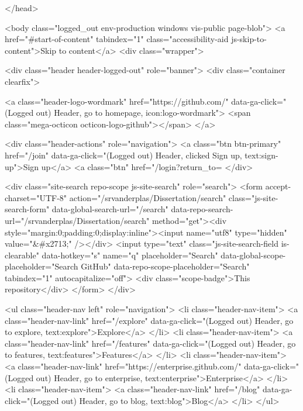   </head>


  <body class="logged_out  env-production windows vis-public page-blob">
    <a href="#start-of-content" tabindex="1" class="accessibility-aid js-skip-to-content">Skip to content</a>
    <div class="wrapper">
      
      
      


        
        <div class="header header-logged-out" role="banner">
  <div class="container clearfix">

    <a class="header-logo-wordmark" href="https://github.com/" data-ga-click="(Logged out) Header, go to homepage, icon:logo-wordmark">
      <span class="mega-octicon octicon-logo-github"></span>
    </a>

    <div class="header-actions" role="navigation">
        <a class="btn btn-primary" href="/join" data-ga-click="(Logged out) Header, clicked Sign up, text:sign-up">Sign up</a>
      <a class="btn" href="/login?return_to=%
    </div>

    <div class="site-search repo-scope js-site-search" role="search">
      <form accept-charset="UTF-8" action="/srvanderplas/Dissertation/search" class="js-site-search-form" data-global-search-url="/search" data-repo-search-url="/srvanderplas/Dissertation/search" method="get"><div style="margin:0;padding:0;display:inline"><input name="utf8" type="hidden" value="&#x2713;" /></div>
  <input type="text"
    class="js-site-search-field is-clearable"
    data-hotkey="s"
    name="q"
    placeholder="Search"
    data-global-scope-placeholder="Search GitHub"
    data-repo-scope-placeholder="Search"
    tabindex="1"
    autocapitalize="off">
  <div class="scope-badge">This repository</div>
</form>
    </div>

      <ul class="header-nav left" role="navigation">
          <li class="header-nav-item">
            <a class="header-nav-link" href="/explore" data-ga-click="(Logged out) Header, go to explore, text:explore">Explore</a>
          </li>
          <li class="header-nav-item">
            <a class="header-nav-link" href="/features" data-ga-click="(Logged out) Header, go to features, text:features">Features</a>
          </li>
          <li class="header-nav-item">
            <a class="header-nav-link" href="https://enterprise.github.com/" data-ga-click="(Logged out) Header, go to enterprise, text:enterprise">Enterprise</a>
          </li>
          <li class="header-nav-item">
            <a class="header-nav-link" href="/blog" data-ga-click="(Logged out) Header, go to blog, text:blog">Blog</a>
          </li>
      </ul>

